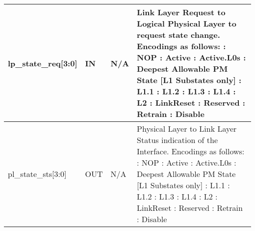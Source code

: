 \begin{table}[H]

    \centering
  \begin{tabular}{ |P{26mm}|P{5mm}|P{10mm} | m{60mm}|  }
  \hline

\hline
lp\_state\_req[3:0] & IN & N/A & 
Link Layer Request to Logical Physical Layer to request state change.
Encodings as follows: : NOP : Active : Active.L0s : Deepest Allowable PM State [L1 Substates only] : L1.1 : L1.2 : L1.3 : L1.4 : L2 : LinkReset : Reserved : Retrain : Disable \newline 
\\ \hline
pl\_state\_sts[3:0] & OUT & N/A &
Physical Layer to Link Layer Status indication of the Interface.
Encodings as follows:
: NOP : Active : Active.L0s : Deepest Allowable PM State [L1 Substates only] : L1.1 : L1.2 : L1.3 : L1.4 : L2 : LinkReset : Reserved : Retrain : Disable \newline
\\ \hline
\end{tabular}
\end{table}


